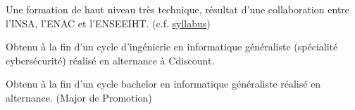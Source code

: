 \documentclass[10pt,a4paper,ragged2e,withhyper]{altacv}
\begin{document}
\begin{paracol}{2}
  \divider\smallskip



  \divider

  \divider

\medskip


  Une formation de haut niveau très technique, résultat d'une collaboration entre
  l'INSA, l'ENAC et l'ENSEEIHT. (c.f. \href{https://tls-sec.github.io/documents/Syllabus_Ms_securite_Informatique_V1.pdf}{syllabus})

  \divider

  Obtenu à la fin d'un cycle d'ingénierie en informatique généraliste (spécialité
  cybersécurité) réalisé en alternance à Cdiscount.

  \divider

  Obtenu à la fin d'un cycle bachelor en informatique généraliste réalisé en
  alternance.
  (Major de Promotion)

  \divider



\end{paracol}
\end{document}

